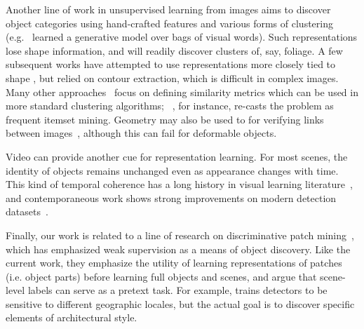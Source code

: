 \documentclass[10pt,twocolumn,letterpaper]{article}
\newcommand{\todo}[1]{\textcolor{red}{TODO: #1}\PackageWarning{TODO:}{#1!}}
\begin{document}

Another line of work in unsupervised learning from images aims to discover object categories using hand-crafted features and various forms of clustering (e.g.~\cite{sivic2005discovering,russell2006using} learned a generative model over bags of visual words). %
Such representations lose shape information, and will readily discover clusters of, say, foliage.   A few subsequent works have attempted to use representations more closely tied to shape \cite{lee2009foreground,payet2010set}, but relied on contour extraction, which is difficult in complex images.  Many other approaches~\cite{grauman2006unsupervised,kim2008unsupervised,faktor2012clustering} focus on defining similarity metrics which can be used in more standard clustering algorithms; ~\cite{RematasCVPR15}, for instance, re-casts the problem as frequent itemset mining. Geometry may also be used to for verifying links between images~\cite{quack2008world,Chum09,heath2010image}, although this can fail for deformable objects.

Video can provide another cue for representation learning.  For most scenes, the identity of objects remains unchanged even as appearance changes with time.  This kind of temporal coherence has a long history in visual learning literature~\cite{foldiak1991learning,wiskott02}, and contemporaneous work shows strong improvements on modern detection datasets~\cite{wang2015unsupervised}.

Finally, our work is related to a line of research on discriminative patch
mining~\cite{doersch2012makes,singh2012unsupervised,juneja13blocks,li2013harvesting,sun2013learning,doersch2013mid}, which has emphasized weak supervision as a means of object discovery.  Like the current work, they emphasize the utility of learning representations of patches (i.e. object parts) before learning full objects and scenes, and argue that scene-level labels can serve as a pretext task.  %
For example, \cite{doersch2012makes} trains detectors to be sensitive to different geographic locales, but the actual goal %
is to discover specific elements of architectural style.
\end{document}
